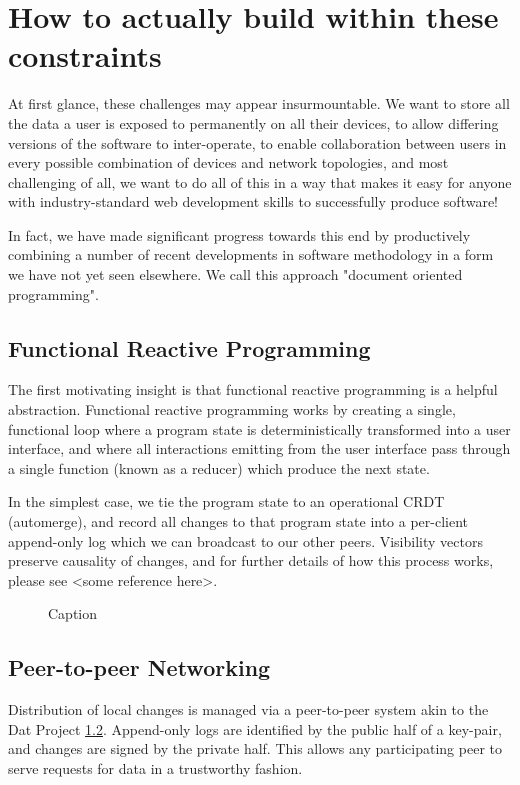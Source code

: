 \documentclass[sigplan,10pt]{acmart}
\begin{document}
\section{How to actually build within these constraints}

At first glance, these challenges may appear insurmountable. We want to store all the data a user is exposed to permanently on all their devices, to allow differing versions of the software to inter-operate, to enable collaboration between users in every possible combination of devices and network topologies, and most challenging of all, we want to do all of this in a way that makes it easy for anyone with industry-standard web development skills to successfully produce software!

In fact, we have made significant progress towards this end by productively combining a number of recent developments in software methodology in a form we have not yet seen elsewhere. We call this approach "document oriented programming".

\subsection{Functional Reactive Programming}
The first motivating insight is that functional reactive programming is a helpful abstraction. Functional reactive programming works by creating a single, functional loop where a program state is deterministically transformed into a user interface, and where all interactions emitting from the user interface pass through a single function (known as a reducer) which produce the next state.

In the simplest case, we tie the program state to an operational CRDT (automerge), and record all changes to that program state into a per-client append-only log which we can broadcast to our other peers. Visibility vectors preserve causality of changes, and for further details of how this process works, please see <some reference here>.

\begin{figure}
    \centering
    \caption{Caption}
    \label{fig:my_label}
\end{figure}

\subsection{Peer-to-peer Networking}

Distribution of local changes is managed via a peer-to-peer system akin to the Dat Project \ref{}. Append-only logs are identified by the public half of a key-pair, and changes are signed by the private half. This allows any participating peer to serve requests for data in a trustworthy fashion.  
\end{document}
